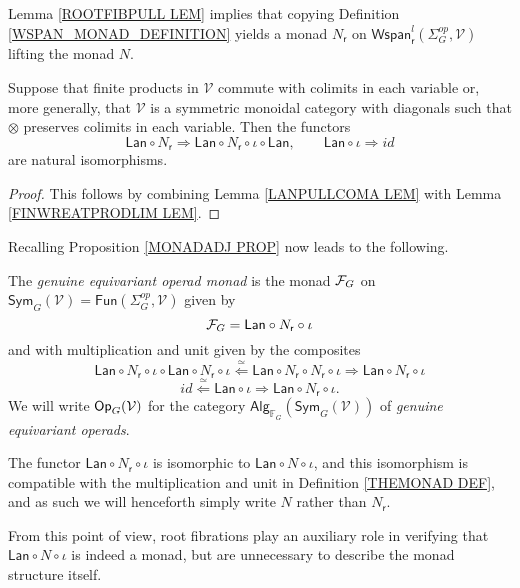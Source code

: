 \documentclass[a4paper,10pt]{article}%
\begin{document}
Lemma \ref{ROOTFIBPULL LEM} implies that copying Definition \ref{WSPAN_MONAD_DEFINITION} yields a monad $N_{\mathsf{r}}$
on
$\mathsf{Wspan}^l_{\mathsf{r}}(\Sigma_G^{op},\mathcal{V})$
lifting the monad $N$.

\begin{corollary}
Suppose that finite products in $\mathcal{V}$ commute with colimits in each variable or, more generally, that 
$\mathcal{V}$ is a symmetric monoidal category with diagonals such that $\otimes$ preserves colimits in each variable.
Then the functors
\[
	\mathsf{Lan} \circ N_{\mathsf{r}} \Rightarrow
	\mathsf{Lan} \circ N_{\mathsf{r}} \circ \iota \circ \mathsf{Lan},
\qquad
	\mathsf{Lan} \circ \iota \Rightarrow id
\]
are natural isomorphisms.
\end{corollary}

\begin{proof}
This follows by combining Lemma \ref{LANPULLCOMA LEM} with Lemma \ref{FINWREATPRODLIM LEM}.
\end{proof}

Recalling Proposition \ref{MONADADJ PROP} now leads to the following.
\begin{definition}\label{THEMONAD DEF}
The \textit{genuine equivariant operad monad} is the monad
$\mathcal F_G$ on $\mathsf{Sym}_G(\mathcal{V})=\mathsf{Fun}(\Sigma_G^{op}, \mathcal{V})$
given by
\[
	\mathcal F_G = \mathsf{Lan} \circ N_{\mathsf{r}} \circ \iota
\]
and with multiplication and unit given by the composites
\[
\mathsf{Lan} \circ N_{\mathsf{r}} \circ \iota \circ
\mathsf{Lan} \circ N_{\mathsf{r}} \circ \iota
\overset{\simeq}{\Leftarrow}
\mathsf{Lan} \circ N_{\mathsf{r}} \circ  N_{\mathsf{r}} \circ \iota
\Rightarrow
\mathsf{Lan} \circ N_{\mathsf{r}} \circ \iota
\]
\[
id \overset{\simeq}{\Leftarrow} \mathsf{Lan} \circ \iota
\Rightarrow
\mathsf{Lan} \circ N_{\mathsf{r}} \circ \iota.
\]
We will write $\mathsf{Op}_G(\mathcal V)$ for the category 
$\mathsf{Alg}_{\mathbb{F}_G}(\mathsf{Sym}_G(\mathcal{V}))$ of \textit{genuine equivariant operads}.
\end{definition}

\begin{remark}
	The functor $\mathsf{Lan} \circ N_{\mathsf{r}} \circ \iota$ is isomorphic to 
	$\mathsf{Lan} \circ N \circ \iota$, and this isomorphism is compatible with the multiplication and unit	in Definition \ref{THEMONAD DEF}, and as such we will henceforth simply write $N$ rather than $N_{\mathsf{r}}$.
	
	From this point of view, root fibrations play an auxiliary role in verifying that $\mathsf{Lan} \circ N \circ \iota$ is indeed a monad, but are unnecessary to describe the monad structure itself.
\end{remark}
\end{document}
